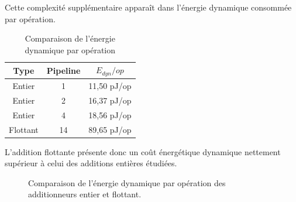 \documentclass[12pt,a4paper]{article}
\begin{document}
Cette complexité supplémentaire apparaît dans l'énergie dynamique
consommée par opération.

\begin{table}[H]
    \centering

    \caption{Comparaison de l'énergie dynamique par opération}

    \begin{tabular}{ccc}
        \toprule

        \textbf{Type} &
        \textbf{Pipeline} &
        \textbf{$E_{dyn}/op$} \\

        \midrule

        Entier & 1 & 11,50 pJ/op \\
        Entier & 2 & 16,37 pJ/op \\
        Entier & 4 & 18,56 pJ/op \\
        Flottant & 14 & 89,65 pJ/op \\

        \bottomrule
    \end{tabular}
\end{table}

L'addition flottante présente donc un coût énergétique dynamique
nettement supérieur à celui des additions entières étudiées.

\begin{figure}[H]
\centering
{}
\caption{Comparaison de l'énergie dynamique par opération
des additionneurs entier et flottant.}
\label{fig:energie_dyn_comparaison}
\end{figure}


\end{document}
